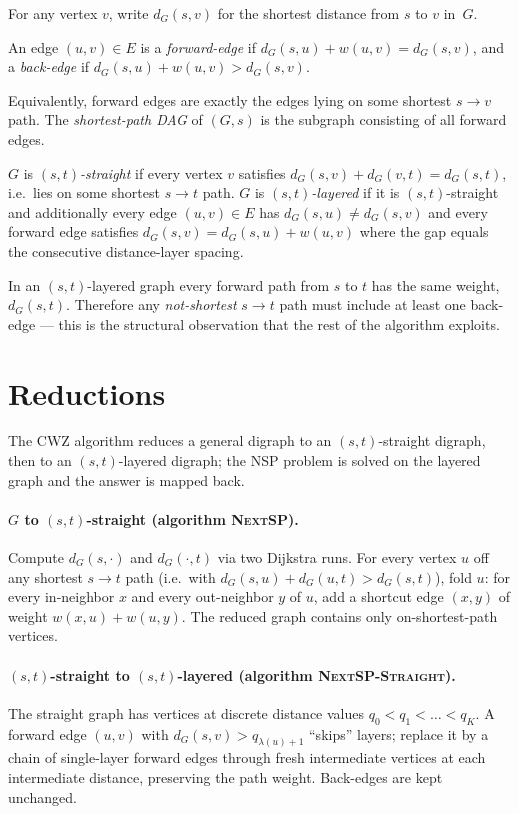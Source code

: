 For any vertex $v$, write $d_G(s,v)$ for the shortest distance from $s$ to
$v$ in~$G$.

\begin{definition}
An edge $(u,v)\in E$ is a \emph{forward-edge} if
$d_G(s,u)+w(u,v)=d_G(s,v)$, and a \emph{back-edge} if
$d_G(s,u)+w(u,v)>d_G(s,v)$.
\end{definition}

Equivalently, forward edges are exactly the edges lying on some shortest
$s\to v$ path. The \emph{shortest-path DAG} of $(G,s)$ is the subgraph
consisting of all forward edges.

\begin{definition}
$G$ is \emph{$(s,t)$-straight} if every vertex $v$ satisfies
$d_G(s,v)+d_G(v,t)=d_G(s,t)$, i.e.~lies on some shortest $s\to t$ path. $G$
is \emph{$(s,t)$-layered} if it is $(s,t)$-straight and additionally every
edge $(u,v)\in E$ has $d_G(s,u)\neq d_G(s,v)$ and every forward edge satisfies
$d_G(s,v) = d_G(s,u)+w(u,v)$ where the gap equals the consecutive
distance-layer spacing.
\end{definition}

In an $(s,t)$-layered graph every forward path from $s$ to $t$ has the same
weight, $d_G(s,t)$. Therefore any \emph{not-shortest} $s\to t$ path must
include at least one back-edge --- this is the structural observation that
the rest of the algorithm exploits.

\section{Reductions}

The CWZ algorithm reduces a general digraph to an $(s,t)$-straight digraph,
then to an $(s,t)$-layered digraph; the NSP problem is solved on the
layered graph and the answer is mapped back.

\paragraph{$G$ to $(s,t)$-straight (algorithm \textsc{NextSP}).}
Compute $d_G(s,\cdot)$ and $d_G(\cdot,t)$ via two Dijkstra runs. For every
vertex $u$ off any shortest $s\to t$ path (i.e.~with
$d_G(s,u)+d_G(u,t)>d_G(s,t)$), fold $u$: for every in-neighbor $x$ and
every out-neighbor $y$ of $u$, add a shortcut edge $(x,y)$ of weight
$w(x,u)+w(u,y)$. The reduced graph contains only on-shortest-path vertices.

\paragraph{$(s,t)$-straight to $(s,t)$-layered (algorithm
\textsc{NextSP-Straight}).} The straight graph has vertices at discrete
distance values $q_0<q_1<\dots<q_K$. A forward edge $(u,v)$ with
$d_G(s,v)>q_{\lambda(u)+1}$ ``skips'' layers; replace it by a chain of
single-layer forward edges through fresh intermediate vertices at each
intermediate distance, preserving the path weight. Back-edges are kept
unchanged.

